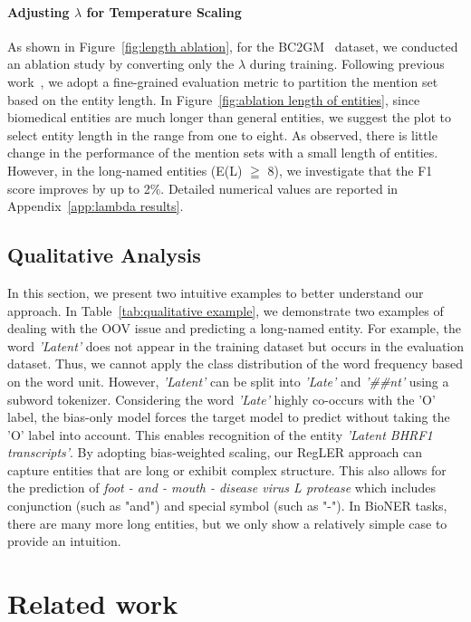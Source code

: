 \documentclass[11pt]{article}
\begin{document}
\paragraph{Adjusting $\lambda$ for Temperature Scaling}
\label{exp:adjust lambda}
As shown in Figure~\ref{fig:length ablation}, for the BC2GM~\cite{smith2008overview} dataset, we conducted an ablation study by converting only the $\lambda$ during training.
Following previous work~\cite{fu-etal-2020-interpretable}, we adopt a fine-grained evaluation metric to partition the mention set based on the entity length.
In Figure~\ref{fig:ablation length of entities}, since biomedical entities are much longer than general entities, we suggest the plot to select entity length in the range from one to eight.
As observed, there is little change in the performance of the mention sets with a small length of entities.
However, in the long-named entities (E(L) $\geqq$ 8), we investigate that the F1 score improves by up to 2\%.
Detailed numerical values are reported in Appendix~\ref{app:lambda results}.

\subsection{Qualitative Analysis}
\label{sec:informative}
In this section, we present two intuitive examples to better understand our approach.
In Table~\ref{tab:qualitative example}, we demonstrate two examples of dealing with the OOV issue and predicting a long-named entity.
For example, the word \textit{'Latent'} does not appear in the training dataset but occurs in the evaluation dataset.
Thus, we cannot apply the class distribution of the word frequency based on the word unit.
However, \textit{'Latent'} can be split into \textit{'Late'} and \textit{'\#\#nt'} using a subword tokenizer.
Considering the word \textit{'Late'} highly co-occurs with the 'O' label, the bias-only model forces the target model to predict without taking the 'O' label into account.
This enables recognition of the entity \textit{'Latent BHRF1 transcripts'}.
By adopting bias-weighted scaling, our RegLER approach can capture entities that are long or exhibit complex structure.
This also allows for the prediction of \textit{foot - and - mouth - disease virus L protease} which includes conjunction (such as "and") and special symbol (such as "-").
In BioNER tasks, there are many more long entities, but we only show a relatively simple case to provide an intuition.


\section{Related work}
\end{document}

